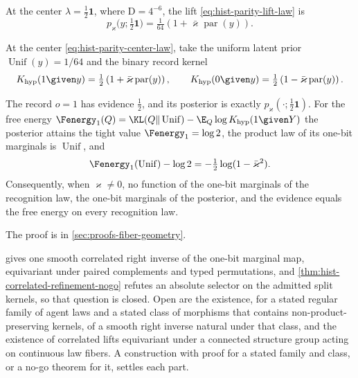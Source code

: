 At the center $\lambda=\tfrac12\mathbf 1$, where $\mathrm D=4^{-6}$, the lift
\eqref{eq:hist-parity-lift-law} is
\begin{equation}
p_\varkappa\bigl(y;\tfrac12\mathbf 1\bigr)
=\tfrac1{64}\left(1+\bar\varkappa\operatorname{par}(y)\right).
\label{eq:hist-parity-center-law}
\end{equation}

At the center \eqref{eq:hist-parity-center-law}, take the uniform latent prior
$\operatorname{Unif}(y)=1/64$ and the binary record kernel
\begin{equation}
K_{\mathrm{hyp}}(1\given y)=\tfrac12\left(1+\bar\varkappa\operatorname{par}(y)\right),
\qquad
K_{\mathrm{hyp}}(0\given y)=\tfrac12\left(1-\bar\varkappa\operatorname{par}(y)\right).
\label{eq:hist-parity-hyperedge-kernel}
\end{equation}

The record $o=1$ has evidence $\tfrac12$, and its posterior is exactly
$p_\varkappa(\cdot;\tfrac12\mathbf 1)$.  For the free energy
$\Fenergy_1(Q)=\KL(Q\Vert\operatorname{Unif})-\E_Q\log K_{\mathrm{hyp}}(1\given Y)$ the
posterior attains the tight value $\Fenergy_1=\log2$, the product law of its one-bit
marginals is $\operatorname{Unif}$, and
\begin{equation}
\Fenergy_1(\operatorname{Unif})-\log2=-\tfrac12\log(1-\bar\varkappa^2).
\label{eq:hist-parity-product-lift-excess}
\end{equation}
Consequently, when $\varkappa\ne0$, no function of the one-bit marginals of the
recognition law, the one-bit marginals of the posterior, and the evidence equals the free
energy on every recognition law.  

The proof is in \cref{sec:proofs-fiber-geometry}.

 gives one smooth correlated right inverse of the
one-bit marginal map, equivariant under paired complements and typed permutations, and
\cref{thm:hist-correlated-refinement-nogo} refutes an absolute selector on the admitted
split kernels, so that question is closed.  Open are the existence, for a stated regular
family of agent laws and a stated class of morphisms that contains
non-product-preserving kernels, of a smooth right inverse natural under that class, and
the existence of correlated lifts equivariant under a connected structure group acting on
continuous law fibers.  A construction with proof for a stated family and class, or a
no-go theorem for it, settles each part.

